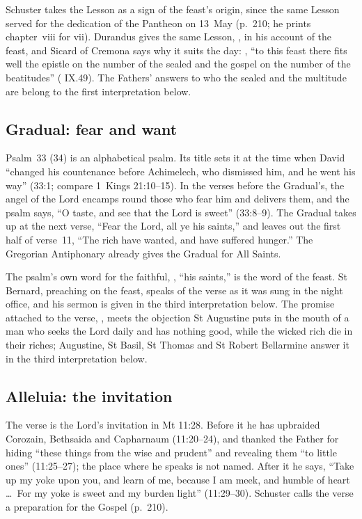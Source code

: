 Schuster takes the Lesson as a sign of the feast's origin, since the same
Lesson served for the dedication of the Pantheon on 13~May (p.~210; he prints
chapter~viii for vii). Durandus gives the same Lesson, , in his account of the feast, and Sicard of Cremona says why it suits
the day: , ``to this feast
there fits well the epistle on the number of the sealed and the gospel on the
number of the beatitudes'' ( IX.49). The Fathers' answers to
who the sealed and the multitude are belong to the first interpretation
below.

\subsection{Gradual: fear and want}
\label{sec:element-gradual}

Psalm~33 (34) is an alphabetical psalm. Its title sets it at the time when
David ``changed his countenance before Achimelech, who dismissed him, and he
went his way'' (33:1; compare 1~Kings 21:10--15). In the verses before the
Gradual's, the angel of the Lord encamps round those who fear him and
delivers them, and the psalm says, ``O taste, and see that the Lord is sweet''
(33:8--9). The Gradual takes up at the next verse, ``Fear the Lord, all ye his
saints,'' and leaves out the first half of verse~11, ``The rich have wanted,
and have suffered hunger.'' The Gregorian Antiphonary already gives the
Gradual for All Saints.

The psalm's own word for the faithful, , ``his saints,'' is
the word of the feast. St Bernard, preaching on the feast, speaks of the verse
as it was sung in the night office, and his sermon is given in the third
interpretation below. The promise attached to the verse, , meets the objection St Augustine puts in the mouth of a
man who seeks the Lord daily and has nothing good, while the wicked rich die
in their riches; Augustine, St Basil, St Thomas and St Robert Bellarmine
answer it in the third interpretation below.

\subsection{Alleluia: the invitation}
\label{sec:element-alleluia}

The verse is the Lord's invitation in Mt 11:28. Before it he has upbraided
Corozain, Bethsaida and Capharnaum (11:20--24), and thanked the Father for
hiding ``these things from the wise and prudent'' and revealing them ``to
little ones'' (11:25--27); the place where he speaks is not named. After it he
says, ``Take up my yoke upon you, and learn of me, because I am meek, and
humble of heart \dots\ For my yoke is sweet and my burden light''
(11:29--30). Schuster calls the verse a preparation for the Gospel (p.~210).


